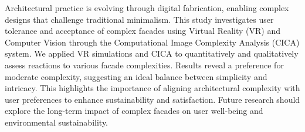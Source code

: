 




Architectural practice is evolving through digital fabrication, enabling complex designs that challenge traditional minimalism.
This study investigates user tolerance and acceptance of complex facades using Virtual Reality (VR) and Computer Vision through the Computational Image Complexity Analysis (CICA) system.
We applied VR simulations and CICA to quantitatively and qualitatively assess reactions to various facade complexities.
Results reveal a preference for moderate complexity, suggesting an ideal balance between simplicity and intricacy.
This highlights the importance of aligning architectural complexity with user preferences to enhance sustainability and satisfaction.
Future research should explore the long-term impact of complex facades on user well-being and environmental sustainability.






